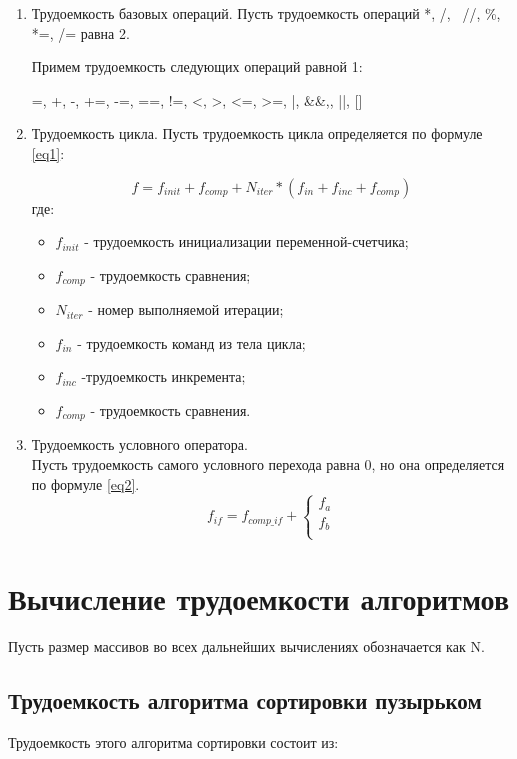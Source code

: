 \begin{enumerate}
	\item Трудоемкость базовых операций.
	Пусть трудоемкость операций *, /, \, //, \%, *=, /= равна 2. 
	
	Примем трудоемкость следующих операций равной 1:
	
	=, +, -, +=, -=, ==, !=, <, >, <=, >=, |, \&\&,, ||, []  
	\item Трудоемкость цикла.
	Пусть трудоемкость цикла определяется по формуле \ref{eq1}:
	
	\begin{equation}
	\label{eq1} 
	f = f_{init} + f_{comp} + N_{iter} * (f_{in} + f_{inc} + f_{comp})
	\end{equation} 
	где:
	\begin{itemize}
	\item $f_{init}$ - трудоемкость инициализации переменной-счетчика;
	\item $f_{comp}$ - трудоемкость сравнения;
	\item $N_{iter}$ - номер выполняемой итерации;
	\item $f_{in}$ - трудоемкость команд из тела цикла;
	\item $f_{inc}$ -трудоемкость инкремента;
	\item $f_{comp}$ - трудоемкость сравнения.
	\end{itemize}
	\item Трудоемкость условного оператора. \\
	Пусть трудоемкость самого условного перехода равна 0, но она определяется по формуле \ref{eq2}. 
	\begin{equation}
		\label{eq2}
		f_{if} = f_{comp\_if} + \begin{cases}
								f_{a}\\
								f_{b}\\
								\end{cases}
	\end{equation}

\end{enumerate}
	

\section{Вычисление трудоемкости алгоритмов}
Пусть размер массивов во всех дальнейших вычислениях обозначается как N.
\subsection{Трудоемкость алгоритма сортировки пузырьком}
Трудоемкость этого алгоритма сортировки состоит из:

